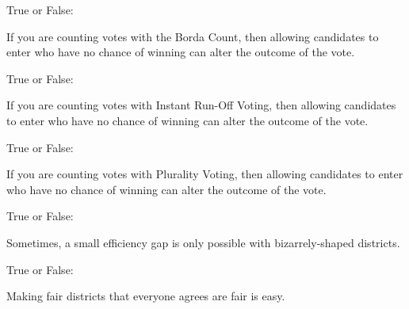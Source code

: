\documentclass[nooutcomes,noauthor]{ximera}
\author{Bart Snapp}
\begin{document}
\maketitle



\begin{exercise}
  True or False:
  
  If you are counting votes with the Borda Count, then allowing
  candidates to enter who have no chance of winning can alter the
  outcome of the vote.
 
\end{exercise}




\begin{exercise}
  True or False:

  If you are counting votes with Instant Run-Off Voting, then allowing
  candidates to enter who have no chance of winning can alter the
  outcome of the vote.
\end{exercise}




\begin{exercise}
  True or False:

  If you are counting votes with Plurality Voting, then allowing
  candidates to enter who have no chance of winning can alter the
  outcome of the vote.
\end{exercise}



\begin{exercise}
  True or False:

  Sometimes, a small efficiency gap is only possible with bizarrely-shaped districts.
\end{exercise}




\begin{exercise}
  True or False:

  Making fair districts that everyone agrees are fair is easy.
\end{exercise}



\end{document}
